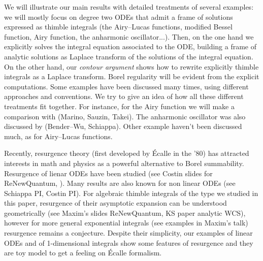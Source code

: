 \documentclass{article}
\theoremstyle{definition}
\begin{document}
We will illustrate our main results with detailed treatments of several examples: we will mostly focus on degree two ODEs that admit a frame of solutions expressed as thimble integrals (the Airy--Lucas functions, modified Bessel function, Airy function, the anharmonic oscillator...). Then, on the one hand we explicitly solves the integral equation associated to the ODE, building a frame of analytic solutions as Laplace transform of the solutions of the integral equation. On the other hand, our \textit{contour argument} shows how to rewrite explicitly thimble integrals as a Laplace transform. Borel regularity will be evident from the explicit computations.
Some examples have been discussed many times, using different approaches and conventions. We try to give an idea of how all these different treatments fit together. For instance, for the Airy function we will make a comparison with (Marino, Sauzin, Takei). The anharmonic oscillator was also discussed by (Bender--Wu, Schiappa). Other example haven't been discussed much, as for Airy--Lucas functions. 

 
Recently, resurgence theory (first developed by \'Ecalle in the '80) has attracted interests in math and physics as a powerful alternative to Borel summability. Resurgence of lienar ODEs have been studied (see Costin slides for ReNewQuantum, \cite{EcalleIII}). Many results are also known for non linear ODEs (see Schiappa PI, Costin PI). For algebraic thimble integrals of the type we studied in this paper, resurgence of their asymptotic expansion can be understood geometrically (see Maxim's slides ReNewQuantum, KS paper analytic WCS), however for more general exponential integrals (see examples in Maxim's talk) resurgence remains a conjecture. Despite their simplicity, our examples of linear ODEs and of 1-dimensional integrals show some features of resurgence and they are toy model to get a feeling on \'Ecalle formalism. 
\end{document}
